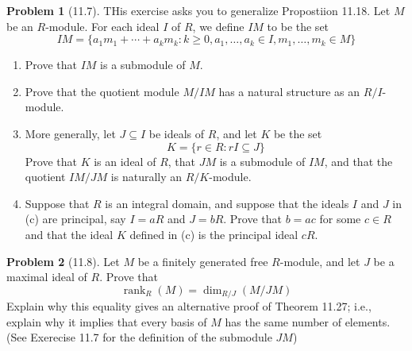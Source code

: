 \documentclass[12pt]{article}
\theoremstyle{definition}
\newtheorem{problem}{Problem}
\DeclareMathOperator{\rank}{rank}
\begin{document}
\begin{problem}[11.7]
    THis exercise asks you to generalize Propostiion 11.18. Let $M$ be an $R$-module. For each ideal $I$ of $R$, we define $IM$ to be the set
    \[
        IM = \{ a_1m_1 + \cdots + a_km_k : k \geq 0, a_1, \ldots, a_k \in I, m_1, \ldots, m_k \in M \}
    \]
    \begin{enumerate}[label=(\alph*)]
        \item Prove that $IM$ is a submodule of $M$.
        
        \begin{solution}

        \end{solution}

        \item Prove that the quotient module $M/IM$ has a natural structure as an $R/I$-module.
        
        \begin{solution}

        \end{solution}

        \item More generally, let $J \subseteq I$ be ideals of $R$, and let $K$ be the set
              \[
                    K =\{ r \in R : rI \subseteq J \}
              \]
            Prove that $K$ is an ideal of $R$, that $JM$ is a submodule of $IM$, and that the quotient $IM/JM$ is naturally an $R/K$-module.
        
        \begin{solution}

        \end{solution}

        \item Suppose that $R$ is an integral domain, and suppose that the ideals $I$ and $J$ in (c) are principal, say $I = aR$ and $J = bR$. Prove that $b = ac$ for some $c \in R$ and that the ideal $K$ defined in (c) is the principal ideal $cR$.
        
        \begin{solution}

        \end{solution}
    \end{enumerate}
\end{problem}

\begin{problem}[11.8]
    Let $M$ be a finitely generated free $R$-module, and let $J$ be a maximal ideal of $R$. Prove that 
    \[
        \rank_R(M) = \dim_{R/J}(M/JM)
    \]
    Explain why this equality gives an alternative proof of Theorem 11.27; i.e., explain why it implies that every basis of $M$ has the same number of elements. (See Exerecise 11.7 for the definition of the submodule $JM$)
    
    \begin{solution}

    \end{solution}
\end{problem}
\end{document}
